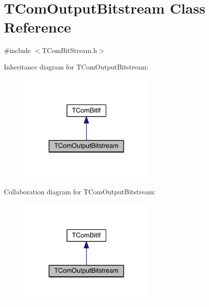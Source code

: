 \hypertarget{class_t_com_output_bitstream}{}\section{T\+Com\+Output\+Bitstream Class Reference}
\label{class_t_com_output_bitstream}


{\ttfamily \#include $<$T\+Com\+Bit\+Stream.\+h$>$}



Inheritance diagram for T\+Com\+Output\+Bitstream\+:
\nopagebreak
\begin{figure}[H]
\begin{center}
\leavevmode
\includegraphics[width=195pt]{d8/da3/class_t_com_output_bitstream__inherit__graph}
\end{center}
\end{figure}


Collaboration diagram for T\+Com\+Output\+Bitstream\+:
\nopagebreak
\begin{figure}[H]
\begin{center}
\leavevmode
\includegraphics[width=195pt]{d7/d16/class_t_com_output_bitstream__coll__graph}
\end{center}
\end{figure}

